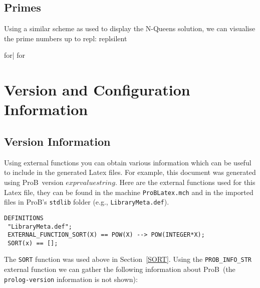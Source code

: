 \documentclass[final]{llncs}
\newcommand{\prob}{{\sc ProB}}
\newcommand{\probrepl}[2][silent]{repl} %
\newcommand{\probexpr}[2][silent]{expr} %
\newcommand{\probif}[3]{if} %
\newcommand{\probfor}[3]{for} %
\begin{document}

\subsection{Primes}

Using a similar scheme as used to display the N-Queens solution, we can visualise the
 prime numbers up to \probrepl{let n = 99}:
 \probrepl{let primes = {p|p:2..n & !x.(x:2..(p-1) => p mod x >0)}}{silent}
   
\begin{center}
\begin{tabular}{\probfor{ii}{0..9}{|c}|}
\hline
\probfor{ii}{0..(n/10)}{  \probfor{jj}{0..8}{  \probif{ii*10+jj:primes}{\probexpr{ii*10+jj}{value}}{~~~} &} \probif{ii*10+9:primes}{\probexpr{ii*10+9}{value}}{~~~} \\ \hline}
\end{tabular}
\end{center}


\section{Version and Configuration Information}


\subsection{Version Information}

Using external functions you can obtain various information which can be useful to include in the
generated Latex files.
For example, this document was generated using \prob\ version $\probexpr{PROB_INFO_STR("prob-version")}{value}{string}$.
Here are the external functions used for this Latex file, they can be found in the machine {\tt ProBLatex.mch}
 and in the imported files in \prob's {\tt stdlib} folder (e.g., {\tt LibraryMeta.def}).

\begin{verbatim}
DEFINITIONS
 "LibraryMeta.def";
 EXTERNAL_FUNCTION_SORT(X) == POW(X) --> POW(INTEGER*X);
 SORT(x) == [];
\end{verbatim}
 

The {\tt SORT} function was used above in Section~\ref{SORT}.
Using the {\tt PROB\_INFO\_STR} external function we can gather the following information about \prob\ (the
 {\tt prolog-version} information is not shown):
\end{document}
